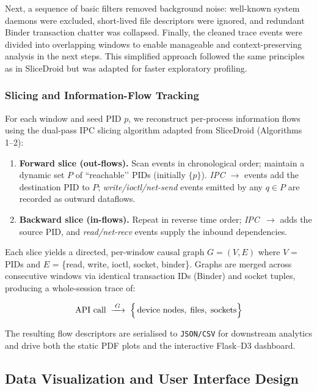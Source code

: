 \documentclass[a4paper,12pt]{report}
\begin{document}
Next, a sequence of basic filters removed background noise: well-known system daemons were excluded, short-lived file descriptors were ignored, and redundant Binder transaction chatter was collapsed. Finally, the cleaned trace events were divided into overlapping windows to enable manageable and context-preserving analysis in the next steps. This simplified approach followed the same principles as in SliceDroid but was adapted for faster exploratory profiling.

\subsubsection{Slicing and Information-Flow Tracking}

For each window and seed PID $p$, we reconstruct per-process
information flows using the dual-pass IPC slicing algorithm adapted
from SliceDroid (Algorithms 1–2):

\begin{enumerate}
  \item \textbf{Forward slice (out-flows).}
        Scan events in chronological order; maintain a dynamic set
        $P$ of “reachable’’ PIDs (initially $\{p\}$).
        \emph{IPC $\rightarrow$} events add the destination PID to $P$;
        \emph{write/ioctl/net-send} events emitted by any
        $q\!\in\!P$ are recorded as outward dataflows.
  \item \textbf{Backward slice (in-flows).}
        Repeat in reverse time order; \emph{IPC~$\rightarrow$} adds
        the source PID, and \emph{read/net-recv} events supply the
        inbound dependencies.
\end{enumerate}

Each slice yields a directed, per-window causal graph
$G=(V,E)$ where
$V$ = PIDs and $E$ = \{read, write, ioctl, socket, binder\}.
Graphs are merged across consecutive windows via identical
transaction IDs (Binder) and socket tuples, producing a
whole-session trace of:

\[
  \text{API call} \;\xrightarrow{\;G\;}\;
  \Bigl\{\,
     \text{device nodes},\;
     \text{files},\;
     \text{sockets}
  \Bigr\}
\]

\noindent
The resulting flow descriptors are serialised to
\texttt{JSON/CSV} for downstream analytics and drive both the static
PDF plots and the interactive Flask–D3 dashboard.


\subsection{Data Visualization and User Interface Design}
\end{document}
